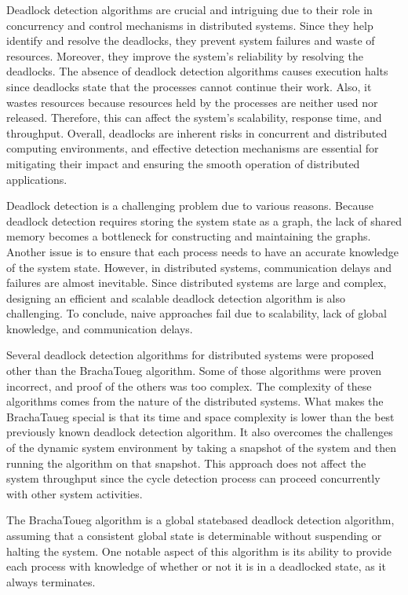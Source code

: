 \documentclass[letterpaper,10pt,english]{sphinxmanual}
\begin{document}
\sphinxAtStartPar
Deadlock detection algorithms are crucial and intriguing due to their role in concurrency and control mechanisms in distributed systems. Since they help identify and resolve the deadlocks, they prevent system failures and waste of resources. Moreover, they improve the system’s reliability by resolving the deadlocks. The absence of deadlock detection algorithms causes execution halts since deadlocks state that the processes cannot continue their work. Also, it wastes resources because resources held by the processes are neither used nor released. Therefore, this can affect the system’s scalability, response time, and throughput. Overall, deadlocks are inherent risks in concurrent and distributed computing environments, and effective detection mechanisms are essential for mitigating their impact and ensuring the smooth operation of distributed applications.

\sphinxAtStartPar
Deadlock detection is a challenging problem due to various reasons. Because deadlock detection requires storing the system state as a graph, the lack of shared memory becomes a bottleneck for constructing and maintaining the graphs. Another issue is to ensure that each process needs to have an accurate knowledge of the system state. However, in distributed systems, communication delays and failures are almost inevitable. Since distributed systems are large and complex, designing an efficient and scalable deadlock detection algorithm is also challenging. To conclude, naive approaches fail due to scalability, lack of global knowledge, and communication delays.

\sphinxAtStartPar
Several deadlock detection algorithms for distributed systems were proposed other than the Bracha\sphinxhyphen{}Toueg algorithm. Some of those algorithms were proven incorrect, and proof of the others was too complex. The complexity of these algorithms comes from the nature of the distributed systems. What makes the Bracha\sphinxhyphen{}Taueg special is that its time and space complexity is lower than the best previously known deadlock detection algorithm. It also overcomes the challenges of the dynamic system environment by taking a snapshot of the system and then running the algorithm on that snapshot. This approach does not affect the system throughput since the cycle detection process can proceed concurrently with other system activities.

\sphinxAtStartPar
The Bracha\sphinxhyphen{}Toueg algorithm is a global state\sphinxhyphen{}based deadlock detection algorithm, assuming that a consistent global state is determinable without suspending or halting the system. One notable aspect of this algorithm is its ability to provide each process with knowledge of whether or not it is in a deadlocked state, as it always terminates.
\end{document}
